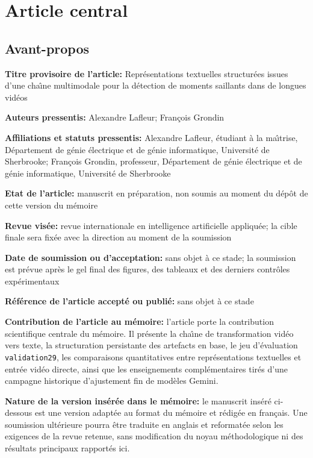 \chapter{Article central}

\section*{Avant-propos}

\textbf{Titre provisoire de l'article:} Repr\'esentations textuelles structur\'ees issues d'une cha\^\i ne multimodale pour la d\'etection de moments saillants dans de longues vid\'eos

\textbf{Auteurs pressentis:} Alexandre Lafleur; Fran\c{c}ois Grondin

\textbf{Affiliations et statuts pressentis:} Alexandre Lafleur, \'etudiant \`a la ma\^\i trise, D\'epartement de g\'enie \'electrique et de g\'enie informatique, Universit\'e de Sherbrooke; Fran\c{c}ois Grondin, professeur, D\'epartement de g\'enie \'electrique et de g\'enie informatique, Universit\'e de Sherbrooke

\textbf{Etat de l'article:} manuscrit en pr\'eparation, non soumis au moment du d\'ep\^ot de cette version du m\'emoire

\textbf{Revue vis\'ee:} revue internationale en intelligence artificielle appliqu\'ee; la cible finale sera fix\'ee avec la direction au moment de la soumission

\textbf{Date de soumission ou d'acceptation:} sans objet \`a ce stade; la soumission est pr\'evue apr\`es le gel final des figures, des tableaux et des derniers contr\^oles exp\'erimentaux

\textbf{R\'ef\'erence de l'article accept\'e ou publi\'e:} sans objet \`a ce stade

\textbf{Contribution de l'article au m\'emoire:} l'article porte la contribution scientifique centrale du m\'emoire. Il pr\'esente la cha\^\i ne de transformation vid\'eo vers texte, la structuration persistante des artefacts en base, le jeu d'\'evaluation \texttt{validation29}, les comparaisons quantitatives entre repr\'esentations textuelles et entr\'ee vid\'eo directe, ainsi que les enseignements compl\'ementaires tir\'es d'une campagne historique d'ajustement fin de mod\`eles Gemini.

\textbf{Nature de la version ins\'er\'ee dans le m\'emoire:} le manuscrit ins\'er\'e ci-dessous est une version adapt\'ee au format du m\'emoire et r\'edig\'ee en fran\c{c}ais. Une soumission ult\'erieure pourra \^etre traduite en anglais et reformat\'ee selon les exigences de la revue retenue, sans modification du noyau m\'ethodologique ni des r\'esultats principaux rapport\'es ici.

\clearpage
